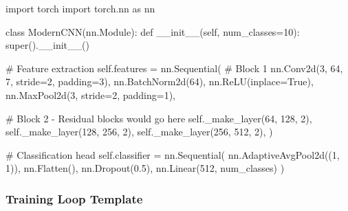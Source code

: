 \documentclass[
  11pt,
  letterpaper,
]{article}
\newenvironment{Shaded}{}{}
\newcommand{\BuiltInTok}[1]{\textcolor[rgb]{0.84,0.23,0.29}{#1}}
\newcommand{\CommentTok}[1]{\textcolor[rgb]{0.42,0.45,0.49}{#1}}
\newcommand{\DecValTok}[1]{\textcolor[rgb]{0.00,0.36,0.77}{#1}}
\newcommand{\FloatTok}[1]{\textcolor[rgb]{0.00,0.36,0.77}{#1}}
\newcommand{\FunctionTok}[1]{\textcolor[rgb]{0.44,0.26,0.76}{#1}}
\newcommand{\ImportTok}[1]{\textcolor[rgb]{0.01,0.18,0.38}{#1}}
\newcommand{\KeywordTok}[1]{\textcolor[rgb]{0.84,0.23,0.29}{#1}}
\newcommand{\NormalTok}[1]{\textcolor[rgb]{0.14,0.16,0.18}{#1}}
\newcommand{\OperatorTok}[1]{\textcolor[rgb]{0.14,0.16,0.18}{#1}}
\newcommand{\VariableTok}[1]{\textcolor[rgb]{0.89,0.38,0.04}{#1}}
\begin{document}
\begin{Shaded}
\begin{Highlighting}[]
\ImportTok{import}\NormalTok{ torch}
\ImportTok{import}\NormalTok{ torch.nn }\ImportTok{as}\NormalTok{ nn}

\KeywordTok{class}\NormalTok{ ModernCNN(nn.Module):}
    \KeywordTok{def} \FunctionTok{\_\_init\_\_}\NormalTok{(}\VariableTok{self}\NormalTok{, num\_classes}\OperatorTok{=}\DecValTok{10}\NormalTok{):}
        \BuiltInTok{super}\NormalTok{().}\FunctionTok{\_\_init\_\_}\NormalTok{()}
        
        \CommentTok{\# Feature extraction}
        \VariableTok{self}\NormalTok{.features }\OperatorTok{=}\NormalTok{ nn.Sequential(}
            \CommentTok{\# Block 1}
\NormalTok{            nn.Conv2d(}\DecValTok{3}\NormalTok{, }\DecValTok{64}\NormalTok{, }\DecValTok{7}\NormalTok{, stride}\OperatorTok{=}\DecValTok{2}\NormalTok{, padding}\OperatorTok{=}\DecValTok{3}\NormalTok{),}
\NormalTok{            nn.BatchNorm2d(}\DecValTok{64}\NormalTok{),}
\NormalTok{            nn.ReLU(inplace}\OperatorTok{=}\VariableTok{True}\NormalTok{),}
\NormalTok{            nn.MaxPool2d(}\DecValTok{3}\NormalTok{, stride}\OperatorTok{=}\DecValTok{2}\NormalTok{, padding}\OperatorTok{=}\DecValTok{1}\NormalTok{),}
            
            \CommentTok{\# Block 2 {-} Residual blocks would go here}
            \VariableTok{self}\NormalTok{.\_make\_layer(}\DecValTok{64}\NormalTok{, }\DecValTok{128}\NormalTok{, }\DecValTok{2}\NormalTok{),}
            \VariableTok{self}\NormalTok{.\_make\_layer(}\DecValTok{128}\NormalTok{, }\DecValTok{256}\NormalTok{, }\DecValTok{2}\NormalTok{),}
            \VariableTok{self}\NormalTok{.\_make\_layer(}\DecValTok{256}\NormalTok{, }\DecValTok{512}\NormalTok{, }\DecValTok{2}\NormalTok{),}
\NormalTok{        )}
        
        \CommentTok{\# Classification head}
        \VariableTok{self}\NormalTok{.classifier }\OperatorTok{=}\NormalTok{ nn.Sequential(}
\NormalTok{            nn.AdaptiveAvgPool2d((}\DecValTok{1}\NormalTok{, }\DecValTok{1}\NormalTok{)),}
\NormalTok{            nn.Flatten(),}
\NormalTok{            nn.Dropout(}\FloatTok{0.5}\NormalTok{),}
\NormalTok{            nn.Linear(}\DecValTok{512}\NormalTok{, num\_classes)}
\NormalTok{        )}
\end{Highlighting}
\end{Shaded}

\subsubsection{Training Loop Template}\label{training-loop-template}
\end{document}
